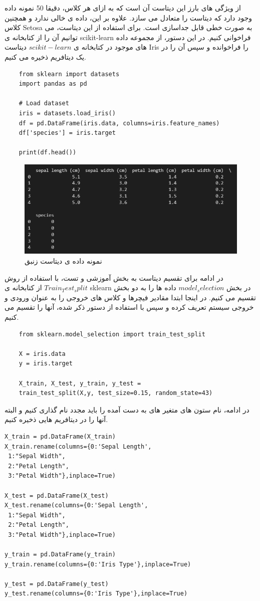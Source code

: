 از ویژگی های بارز این دیتاست آن است که به ازای هر کلاس، دقیقا 50 نمونه داده وجود دارد که دیتاست را متعادل می سازد. علاوه بر این، داده ی خالی ندارد و همچنین کلاس Setosa به صورت خطی قابل جداسازی است.
برای استفاده از این دیتاست، می توانیم آن را از کتابخانه ی scikit-learn فراخوانی کنیم. در این دستور، از مجموعه داده های موجود در کتابخانه ی $scikit-learn$ دیتاست Iris را فراخوانده و سپس آن را در یک دیتافریم ذخیره می کنیم.
\begin{verbatim}
	from sklearn import datasets
	import pandas as pd
	
	# Load dataset
	iris = datasets.load_iris()
	df = pd.DataFrame(iris.data, columns=iris.feature_names)
	df['species'] = iris.target
	
	print(df.head())
\end{verbatim}
\begin{figure}[H]
	\centering
	\includegraphics[width=0.7\linewidth]{../img/7}
	\caption{نمونه داده ی دیتاست زنبق}
	\label{fig:7}
\end{figure}

در ادامه برای تقسیم دیتاست به بخش آموزشی و تست، با استفاده از روش $Train_Test_split$ از کتابخانه ی sklearn در بخش $model_selection$ داده ها را به دو بخش تقسیم می کنیم. در اینجا ابتدا مقادیر فیچرها و کلاس های خروجی را به عنوان ورودی و خروجی سیستم تعریف کرده و سپس با استفاده از دستور ذکر شده، آنها را تقسیم می کنیم.
\begin{verbatim}
	from sklearn.model_selection import train_test_split
	
	X = iris.data
	y = iris.target
	
	X_train, X_test, y_train, y_test =
	train_test_split(X,y, test_size=0.15, random_state=43) 
\end{verbatim}
در ادامه، نام ستون های متغیر های به دست آمده را باید مجدد نام گذاری کنیم و البته آنها را در دیتافریم هایی ذخیره کنیم.
\begin{verbatim}
X_train = pd.DataFrame(X_train)
X_train.rename(columns={0:'Sepal Length',
 1:"Sepal Width",
 2:"Petal Length",
 3:"Petal Width"},inplace=True)

X_test = pd.DataFrame(X_test)
X_test.rename(columns={0:'Sepal Length',
 1:"Sepal Width",
 2:"Petal Length",
 3:"Petal Width"},inplace=True)

y_train = pd.DataFrame(y_train)
y_train.rename(columns={0:'Iris Type'},inplace=True)

y_test = pd.DataFrame(y_test)
y_test.rename(columns={0:'Iris Type'},inplace=True)

\end{verbatim}


